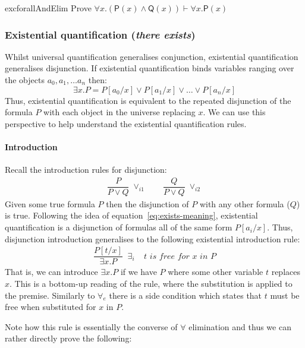 \documentclass{article}
\theoremstyle{definition}
\newcommand{\rel}[1]{\mathsf{#1}}
\begin{document}
\begin{restatable}{exc}{forallAndElim}
  Prove $\forall x . (\rel{P}(x) \wedge \rel{Q}(x)) \vdash \forall x . \rel{P}(x)$
\end{restatable}

\subsubsection{Existential quantification (\emph{there exists})}

Whilst universal quantification generalises conjunction,
existential quantification generalises disjunction. 
If existential quantification binds variables ranging
over the objects $a_0, a_1, \ldots a_n$ then:
%
\begin{equation}
\exists x . P = P[a_0/x] \vee P[a_1/x] \vee
\ldots \vee P[a_{n}/x]
\label{eq:exists-meaning}
\end{equation}
%
Thus, existential quantification is equivalent to the repeated
disjunction of the formula $P$ with each object in the universe
replacing $x$. We can use this perspective to help understand the
existential quantification rules.

\paragraph{Introduction} Recall the introduction rules for disjunction:
%
\begin{align*}
    \dfrac{P}
  {P \vee Q} \; {\vee_{i1}}
  \qquad
    \dfrac{Q}
  {P \vee Q} \; {\vee_{i2}}
\end{align*}
%
Given some true formula $P$ then the disjunction of $P$ with any other
formula ($Q$) is true. Following the idea of
equation~\eqref{eq:exists-meaning}, existential quantification is a
disjunction of formulas all of the same form $P[a_i/x]$.  Thus,
disjunction introduction generalises to the following existential
introduction rule:
%
\begin{align*}
\dfrac{P[t/x]}{\exists x . P} \;\; \exists_i \;\;\;\;
\textit{$t$ is free for $x$ in $P$}
\end{align*}
%
That is, we can introduce $\exists x . P$ if we have
$P$ where some other variable $t$ replaces $x$. This
is a bottom-up reading of the rule, where the substitution
is applied to the premise. Similarly to $\forall_e$ there is a
side condition which states that $t$ must be free when substituted
for $x$ in $P$.

Note how this rule is essentially
the converse of $\forall$ elimination and thus we can
rather directly prove the following:
\end{document}
